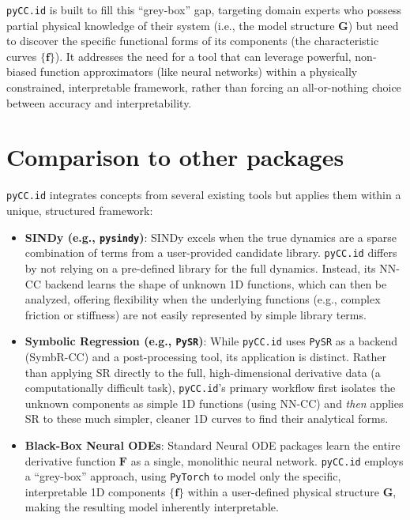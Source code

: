 \texttt{pyCC.id} is built to fill this ``grey-box'' gap, targeting
domain experts who possess partial physical knowledge of their system
(i.e., the model structure \(\mathbf{G}\)) but need to discover the
specific functional forms of its components (the characteristic curves
\(\{\mathbf{f}\}\)). It addresses the need for a tool that can leverage
powerful, non-biased function approximators (like neural networks)
within a physically constrained, interpretable framework, rather than
forcing an all-or-nothing choice between accuracy and interpretability.

\hypertarget{comparison-to-other-packages}{%
\section{Comparison to other
packages}\label{comparison-to-other-packages}}

\texttt{pyCC.id} integrates concepts from several existing tools but
applies them within a unique, structured framework:

\begin{itemize}
\item
  \textbf{SINDy (e.g., \texttt{pysindy})}: SINDy \autocite{Brunton2016}
  excels when the true dynamics are a sparse combination of terms from a
  user-provided candidate library. \texttt{pyCC.id} differs by not
  relying on a pre-defined library for the full dynamics. Instead, its
  NN-CC backend learns the shape of unknown 1D functions, which can then
  be analyzed, offering flexibility when the underlying functions (e.g.,
  complex friction or stiffness) are not easily represented by simple
  library terms.
\item
  \textbf{Symbolic Regression (e.g., \texttt{PySR})}: While
  \texttt{pyCC.id} uses \texttt{PySR} \autocite{Cranmer2023PySR} as a
  backend (SymbR-CC) and a post-processing tool, its application is
  distinct. Rather than applying SR directly to the full,
  high-dimensional derivative data (a computationally difficult task),
  \texttt{pyCC.id}'s primary workflow first isolates the unknown
  components as simple 1D functions (using NN-CC) and \emph{then}
  applies SR to these much simpler, cleaner 1D curves to find their
  analytical forms.
\item
  \textbf{Black-Box Neural ODEs}: Standard Neural ODE packages learn the
  entire derivative function \(\mathbf{F}\) as a single, monolithic
  neural network. \texttt{pyCC.id} employs a ``grey-box'' approach,
  using \texttt{PyTorch} \autocite{Paszke2019pytorch} to model only the
  specific, interpretable 1D components \(\{\mathbf{f}\}\) within a
  user-defined physical structure \(\mathbf{G}\), making the resulting
  model inherently interpretable.
\end{itemize}

